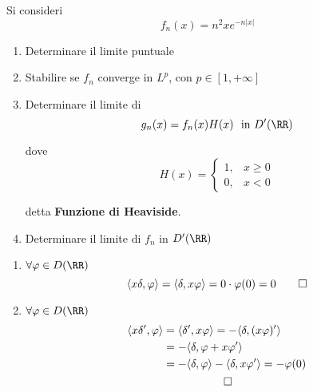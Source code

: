 Si consideri
\begin{equation*}
f_{n}(x) = n^{2} xe^{- n| x|}
\end{equation*}
\begin{enumerate}
\item Determinare il limite puntuale
\item Stabilire se $f_{n}$ converge in $L^{p}$, con $p\in [ 1, + \infty ]$
\item Determinare il limite di
\begin{equation*}
g_{n}(x) = f_{n}(x) H(x) \ \ \text{in} \ D'(\RR)
\end{equation*}

dove
\begin{equation*}
H(x) =
\begin{cases}
1, & x \geq 0\\
0, & x < 0
\end{cases}
\end{equation*}

detta \textbf{Funzione di Heaviside}.
\item Determinare il limite di $f_{n}$ in $D'(\RR)$
\end{enumerate}

\ParteSoluzioni

\Soluzione

\begin{enumerate}
\item $\forall \varphi \in D(\RR)$
\begin{equation*}
\langle x\delta, \varphi \rangle = \langle \delta, x\varphi \rangle = 0 \cdot \varphi (0) = 0\qed
\end{equation*}
\item $\forall \varphi \in D(\RR)$
\begin{gather*}
\begin{aligned}
\langle x\delta', \varphi \rangle & = \langle \delta', x\varphi \rangle = - \langle \delta, (x\varphi)'\rangle \\
 & = - \langle \delta, \varphi + x\varphi'\rangle \\
 & = - \langle \delta, \varphi \rangle - \langle \delta, x\varphi'\rangle = - \varphi (0)
\end{aligned}\\
\qed
\end{gather*}
\end{enumerate}

\Soluzione

